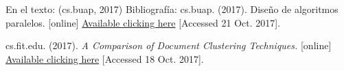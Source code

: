 \documentclass[fleqn,10pt]{SelfArx} %
\begin{document}
\begin{thebibliography}{9}
En el texto: (cs.buap, 2017)
Bibliografía: cs.buap. (2017). Diseño de algoritmos paralelos. [online] \href{https://www.cs.buap.mx/~mtovar/doc/ProgConc/ProgramacionParalela.pdf}{Available clicking here} [Accessed 21 Oct. 2017].

\bibitem cs.fit.edu. (2017). \textit{A Comparison of Document Clustering Techniques.} [online]  \href{http://cs.fit.edu/~pkc/classes/ml-internet/papers/steinbach00tr.pdf}{Available clicking here} [Accessed 18 Oct. 2017].

\end{thebibliography}




\end{document}
